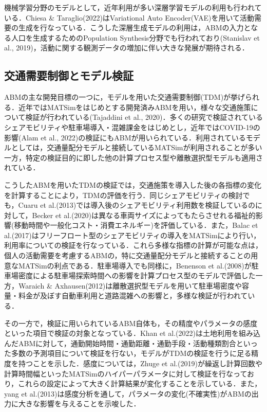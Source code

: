 機械学習分野のモデルとして，近年利用が多い深層学習モデルの利用も行われている．Chiesa \& Taraglio(2022)はVariational Auto Encoder(VAE)を用いて活動需要の生成を行なっている．こうした深層生成モデルの利用は，ABMの入力となる人口を生成するためのPopulation Synthesis分野でも行われており(Stanislav et al., 2019)，活動に関する観測データの増加に伴い大きな発展が期待される．

\subsection{交通需要制御とモデル検証}\label{2.1.2}

ABMの主な開発目標の一つに，モデルを用いた交通需要制御(TDM)が挙げられる．近年ではMATSimをはじめとする開発済みABMを用い，様々な交通施策について検証が行われている(Tajaddini et al., 2020)．多くの研究で検証されているシェアモビリティや駐車場導入・混雑課金をはじめとし，近年ではCOVID-19の影響(Alam et al., 2022)の検証にもABMが用いられている．利用されているモデルとしては，交通量配分モデルと接続しているMATSimが利用されることが多い一方，特定の検証目的に即した他の計算プロセス型や離散選択型モデルも適用されている．

こうしたABMを用いたTDMの検証では，交通施策を導入した後の各指標の変化を計算することにより，TDMの評価を行う．同じシェアモビリティの検討でも，Cuaru et al.(2013)では導入後のシェアモビリティ利用数を検証しているのに対して，Becker et al.(2020)は異なる車両サイズによってもたらさせれる福祉的影響(移動時間や一般化コスト・消費エネルギー)を評価している．また，Balac et al.(2017)はフリーフロート型のシェアモビリティの導入をMATSimにより行い，利用率についての検証を行なっている．これら多様な指標の計算が可能な点は，個人の活動需要を考慮するABMの，特に交通量配分モデルと接続することの用意なMATSimの利点である．駐車場導入でも同様に，Benenson et al.(2008)が駐車場密度による駐車場探索時間への影響を計算プロセス型のモデルで評価した一方，Waraich \& Axhausen(2012)は離散選択型モデルを用いて駐車場密度や容量・料金が及ぼす自動車利用と道路混雑への影響と，多様な検証が行われている．

その一方で，検証に用いられているABM自体も，その精度やパラメータの感度といった項目で検証の対象となっている．Khan et al.(2022)は土地利用を組み込んだABMに対して，通勤開始時間・通勤距離・通勤手段・活動種類割合といった多数の予測項目について検証を行ない，モデルがTDMの検証を行うに足る精度を持つことを示した．感度については，Zhuge et al.(2019)が繰返し計算回数や計算時間幅といったMATSimのハイパーパラメータに対して検証を行なっており，これらの設定によって大きく計算結果が変化することを示している．また，yang et al.(2013)は感度分析を通して，パラメータの変化(不確実性)がABMの出力に大きな影響を与えることを示唆した．

